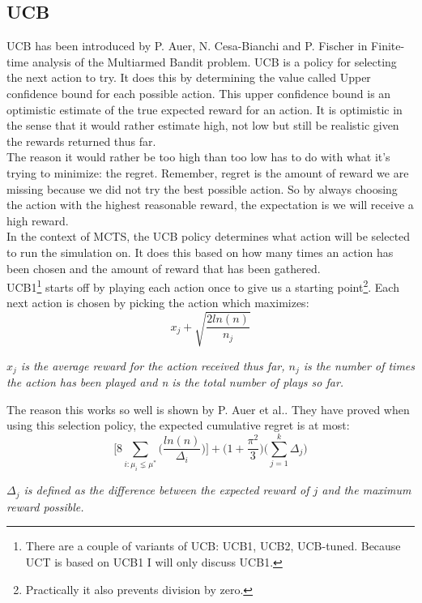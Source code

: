 \documentclass[
11pt, %
english, %
singlespacing, %
headsepline, %
]{MastersDoctoralThesis} %
\begin{document}
\subsection{UCB}
UCB has been introduced by P. Auer, N. Cesa-Bianchi and P. Fischer in Finite-time analysis of the Multiarmed Bandit problem\cite{auer2002finite}. UCB is a policy for selecting the next action to try. It does this by determining the value called Upper confidence bound for each possible action. This upper confidence bound is an optimistic estimate of the true expected reward for an action. It is  optimistic in the sense that it would rather estimate high, not low but still be realistic given the rewards returned thus far.\\
The reason it would rather be too high than too low has to do with what it's trying to minimize: the regret. Remember, regret is the amount of reward we are missing because we did not try the best possible action. So by always choosing the action with the highest reasonable reward, the expectation is we will receive a high reward.\\
In the context of MCTS, the UCB policy determines what action will be selected to run the simulation on. It does this based on how many times an action has been chosen and the amount of reward that has been gathered.\\

UCB1\footnote{There are a couple of variants of UCB: UCB1, UCB2, UCB-tuned. Because UCT is based on UCB1 I will only discuss UCB1.} starts off by playing each action once to give us a starting point\footnote{Practically it also prevents division by zero.}. Each next action is chosen by picking the action which maximizes:
\[
    x_j + \sqrt{\dfrac{2 ln(n)}{n_j}}
\]

\textit{$x_j$ is the average reward for the action received thus far, $n_j$ is the number of times the action has been played and n is the total number of plays so far.\\}

The reason this works so well is shown by P. Auer et al.\cite{auer2002finite}. They have proved when using this selection policy, the expected cumulative regret is at most: 
\[
    \Bigg[ 8 \sum_{i:\mu_i\lneq\mu^*}\bigg(\dfrac{ln(n)}{\Delta_i}\bigg)\Bigg] + \Bigg( 1 + \dfrac{\pi^2}{3}\Bigg)
    \Bigg(\sum_{j=1}^{k}\Delta_j\Bigg)
\]

\textit{$\Delta_j$ is defined as the difference between the expected reward of $j$ and the maximum reward possible.\\}
\end{document}
